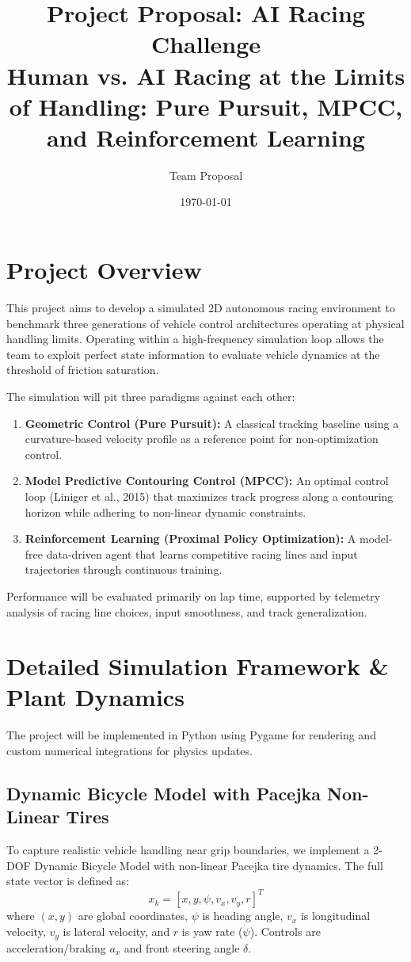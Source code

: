 \documentclass[12pt]{article}
\title{\textbf{Project Proposal: AI Racing Challenge} \\ \large Human vs. AI Racing at the Limits of Handling: Pure Pursuit, MPCC, and Reinforcement Learning}
\author{Team Proposal}
\date{\today}
\begin{document}
\maketitle

\section{Project Overview}
This project aims to develop a simulated 2D autonomous racing environment to benchmark three generations of vehicle control architectures operating at physical handling limits. Operating within a high-frequency simulation loop allows the team to exploit perfect state information to evaluate vehicle dynamics at the threshold of friction saturation.

The simulation will pit three paradigms against each other:
\begin{enumerate}[noitemsep]
    \item \textbf{Geometric Control (Pure Pursuit):} A classical tracking baseline using a curvature-based velocity profile as a reference point for non-optimization control.
    \item \textbf{Model Predictive Contouring Control (MPCC):} An optimal control loop (Liniger et al., 2015) that maximizes track progress along a contouring horizon while adhering to non-linear dynamic constraints.
    \item \textbf{Reinforcement Learning (Proximal Policy Optimization):} A model-free data-driven agent that learns competitive racing lines and input trajectories through continuous training.
\end{enumerate}
Performance will be evaluated primarily on lap time, supported by telemetry analysis of racing line choices, input smoothness, and track generalization.

\section{Detailed Simulation Framework \& Plant Dynamics}
The project will be implemented in Python using Pygame for rendering and custom numerical integrations for physics updates.

\subsection*{Dynamic Bicycle Model with Pacejka Non-Linear Tires}
To capture realistic vehicle handling near grip boundaries, we implement a 2-DOF Dynamic Bicycle Model with non-linear Pacejka tire dynamics. The full state vector is defined as:
\[ x_k = [x, y, \psi, v_x, v_y, r]^T \]
where $(x, y)$ are global coordinates, $\psi$ is heading angle, $v_x$ is longitudinal velocity, $v_y$ is lateral velocity, and $r$ is yaw rate ($\dot{\psi}$). Controls are acceleration/braking $a_x$ and front steering angle $\delta$.
\end{document}
